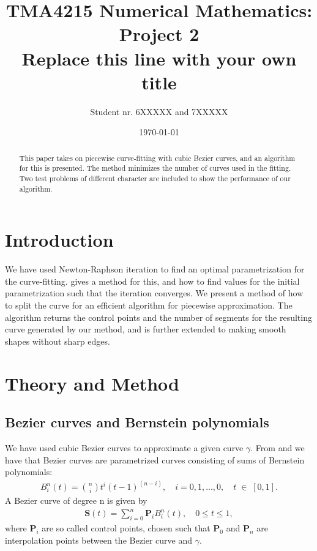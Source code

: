 \documentclass[10pt]{article}
\title{TMA4215 Numerical Mathematics: Project 2 \\ Replace this line with your own title}
\author{Student nr. 6XXXXX and 7XXXXX} %
\date{\today}
\begin{document}
\maketitle
\begin{abstract}
This paper takes on piecewise curve-fitting with cubic Bezier curves, and an algorithm for this is presented. The method minimizes the number of curves used in the fitting. Two test problems of different character are included to show the performance of our algorithm.
\end{abstract}

\section*{Introduction} 
We have used Newton-Raphson iteration to find an optimal parametrization for the curve-fitting. \cite{Plass:1983} gives a method for this, and how to find values for the initial parametrization such that the iteration converges. We present a method of how to split the curve for an efficient algorithm for piecewise approximation. The algorithm returns the control points and the number of segments for the resulting curve generated by our method, and is further extended to making smooth shapes without sharp edges.


\section*{Theory and Method}

\subsection*{Bezier curves and Bernstein polynomials}

We have used cubic Bezier curves to approximate a given curve $\gamma$. From \cite{wiki:Bezier} and  we have that Bezier curves are parametrized curves consisting of sums of Bernstein polynomials:
\begin{align}
B_{i}^n(t) = \binom{n}{i}t^i(t-1)^{(n-i)},\quad i = 0, 1, ..., 0,\quad t \; \in \; [0,1].
\end{align}
A Bezier curve of degree n is given by
\begin{align}
\mathbf{S}(t) = \sum_{i=0}^{n} \mathbf{P}_i B_{i}^n(t), \quad 0 \leq t \leq 1,
\end{align}
where $\mathbf{P}_i$ are so called control points, chosen such that $\mathbf{P}_0$ and $\mathbf{P}_n$ are interpolation points between the Bezier curve and $\gamma$.
\end{document}
